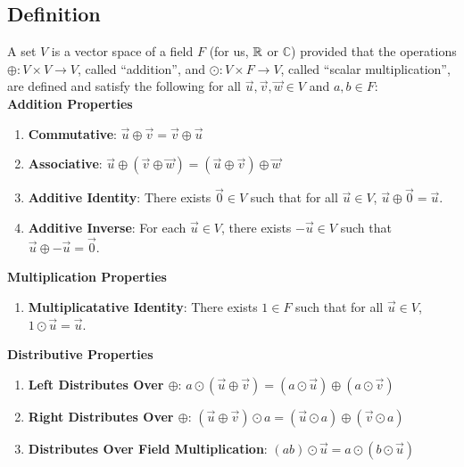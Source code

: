 \subsection{Definition}
\begin{definition}
	A set $V$ is a vector space of a field $F$ (for us, $\mathbb{R}$ or $\mathbb{C}$) provided that the operations $\oplus: V\times V \to V$, called ``addition'', and $\odot: V \times F \to V$, called ``scalar multiplication'', are defined and satisfy the following for all $\vec{u}, \vec{v}, \vec{w} \in V$ and $a,b \in F$: \\
	
	\textbf{Addition Properties}
	\begin{enumerate}
		\item \textbf{Commutative}: $\vec{u} \oplus \vec{v} = \vec{v} \oplus \vec{u}$
		\item \textbf{Associative}: $\vec{u} \oplus (\vec{v} \oplus \vec{w}) = (\vec{u} \oplus \vec{v}) \oplus \vec{w}$
		\item \textbf{Additive Identity}: There exists $\vec{0} \in V$ such that for all $\vec{u} \in V$, $\vec{u} \oplus \vec{0} = \vec{u}$.
		\item \textbf{Additive Inverse}: For each $\vec{u} \in V$, there exists $-\vec{u} \in V$ such that $\vec{u} \oplus -\vec{u} = \vec{0}$.
	\end{enumerate}
	
	\textbf{Multiplication Properties}
	\begin{enumerate}
		\item \textbf{Multiplicatative Identity}: There exists $1 \in F$ such that for all $\vec{u} \in V$, $1 \odot \vec{u} = \vec{u}$.
	\end{enumerate}
	
	\textbf{Distributive Properties}
	\begin{enumerate}
		\item \textbf{Left Distributes Over $\oplus$}: $a \odot \left(\vec{u} \oplus \vec{v}\right) = \left(a \odot \vec{u}\right) \oplus \left(a \odot \vec{v}\right)$
		\item \textbf{Right Distributes Over $\oplus$}: $\left(\vec{u} \oplus \vec{v}\right) \odot a = \left(\vec{u} \odot a\right) \oplus \left(\vec{v} \odot a\right)$
		\item \textbf{Distributes Over Field Multiplication}: $(ab)\odot\vec{u} = a\odot(b\odot\vec{u})$
	\end{enumerate}
\end{definition}

